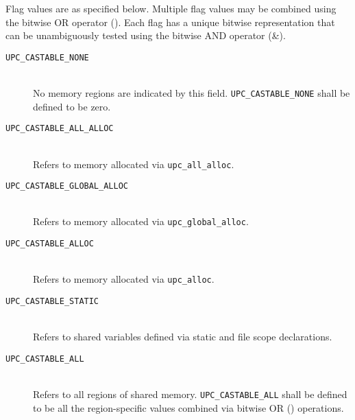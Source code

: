 \np Flag values are as specified below.  Multiple flag values may be
combined using the bitwise OR operator ({\textbar}).  Each flag has a
unique bitwise representation that can be unambiguously tested using the
bitwise AND operator (\&).

\begin{description}
\item[{\tt UPC\_CASTABLE\_NONE}] \hfill \\
No memory regions are indicated by this field.  {\tt UPC\_CASTABLE\_NONE}
shall be defined to be zero.
\item[{\tt UPC\_CASTABLE\_ALL\_ALLOC}] \hfill \\
Refers to memory allocated via {\tt upc\_all\_alloc}.
\item[{\tt UPC\_CASTABLE\_GLOBAL\_ALLOC}] \hfill \\
Refers to memory allocated via {\tt upc\_global\_alloc}.
\item[{\tt UPC\_CASTABLE\_ALLOC}] \hfill \\
Refers to memory allocated via {\tt upc\_alloc}.
\item[{\tt UPC\_CASTABLE\_STATIC}] \hfill \\
Refers to shared variables defined via static and file scope declarations.
\item[{\tt UPC\_CASTABLE\_ALL}] \hfill \\
Refers to all regions of shared memory.  {\tt UPC\_CASTABLE\_ALL} shall
be defined to be all the region-specific values combined via bitwise
OR ({\textbar}) operations.
\end{description}

\pagebreak
\appendix
